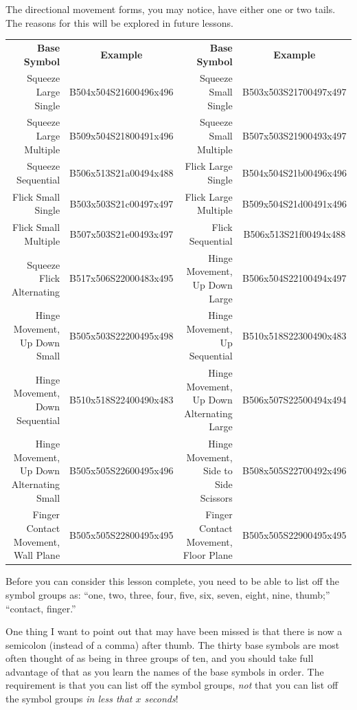 \documentclass{article}
\begin{document}
The directional movement forms, you may notice, have either one or two tails.
The reasons for this will be explored in future lessons.

\begin{center}
\begin{tabular}{rcrc}
\textbf{Base Symbol}&\textbf{Example}&\textbf{Base Symbol}&\textbf{Example}\\
Squeeze Large Single                     &B504x504S21600496x496&Squeeze Small Single                     &B503x503S21700497x497\\
Squeeze Large Multiple                   &B509x504S21800491x496&Squeeze Small Multiple                   &B507x503S21900493x497\\
Squeeze Sequential                       &B506x513S21a00494x488&Flick Large Single                       &B504x504S21b00496x496\\
Flick Small Single                       &B503x503S21c00497x497&Flick Large Multiple                     &B509x504S21d00491x496\\
Flick Small Multiple                     &B507x503S21e00493x497&Flick Sequential                         &B506x513S21f00494x488\\
Squeeze Flick Alternating                &B517x506S22000483x495&Hinge Movement, Up Down Large            &B506x504S22100494x497\\
Hinge Movement, Up Down Small            &B505x503S22200495x498&Hinge Movement, Up Sequential            &B510x518S22300490x483\\
Hinge Movement, Down Sequential          &B510x518S22400490x483&Hinge Movement, Up Down Alternating Large&B506x507S22500494x494\\
Hinge Movement, Up Down Alternating Small&B505x505S22600495x496&Hinge Movement, Side to Side Scissors    &B508x505S22700492x496\\
Finger Contact Movement, Wall Plane      &B505x505S22800495x495&Finger Contact Movement, Floor Plane     &B505x505S22900495x495\\
\end{tabular}
\end{center}

Before you can consider this lesson complete, you need to be able to list off the symbol groups as:
``one, two, three, four, five, six, seven, eight, nine, thumb;''
``contact, finger.''

One thing I want to point out that may have been missed is that there is now a semicolon (instead of a comma) after thumb.
The thirty base symbols are most often thought of as being in three groups of ten, and you should take full advantage of that as you learn the names of the base symbols in order.
The requirement is that you can list off the symbol groups, \emph{not} that you can list off the symbol groups \emph{in less that $x$ seconds}!
\end{document}
